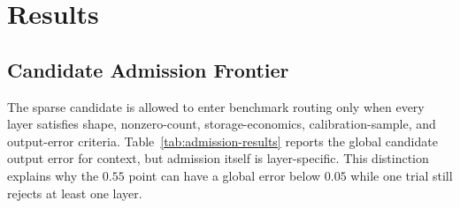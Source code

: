 \documentclass{article}
\begin{document}
\section{Results}
\label{sec:results}

\subsection{Candidate Admission Frontier}

The sparse candidate is allowed to enter benchmark routing only when every
layer satisfies shape, nonzero-count, storage-economics, calibration-sample,
and output-error criteria. Table~\ref{tab:admission-results} reports the global
candidate output error for context, but admission itself is layer-specific.
This distinction explains why the $0.55$ point can have a global error below
$0.05$ while one trial still rejects at least one layer.

\begin{table}[t]
\centering
\caption{Candidate-admission frontier. Values are mean [95\% CI] over three
process means. ``Full'' counts trials in which all candidate layers were
eligible. Throughput at rejected points primarily measures reference fallback,
not execution of the rejected sparse candidate.}
\label{tab:admission-results}
\small
{}
\end{table}
\end{document}
